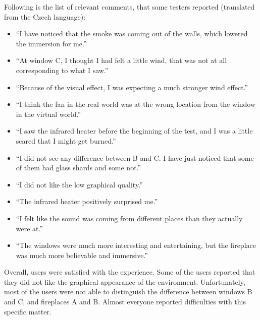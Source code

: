 Following is the list of relevant comments, that some testers reported
(translated from the Czech language):


\begin{itemize}

\item ``I have noticed that the smoke was coming out of the walls, which
lowered the immersion for me.''

\item ``At window C, I thought I had felt a little wind,
that was not at all corresponding to what I saw.''

\item ``Because of the visual effect, I was expecting a much stronger wind
effect.''

\item ``I think the fan in the real world was at the wrong location from the
window in the virtual world.''

\item ``I saw the infrared heater before the beginning of the test, and I was
a little scared that I might get burned.''

\item ``I did not see any difference between B and C. I have just noticed that
some of them had glass shards and some not.''

\item ``I did not like the low graphical quality.''

\item ``The infrared heater positively surprised me.''

\item ``I felt like the sound was coming from different places than they actually
were at.''

\item ``The windows were much more interesting and entertaining, but the fireplace
was much more believable and immersive.''

\end{itemize}


Overall, users were satisfied with the experience. Some of the users reported
that they did not like the graphical appearance of the environment.
Unfortunately, most of the users were not able to distinguish the difference
between windows B and C, and fireplaces A and B. Almost everyone reported
difficulties with this specific matter.